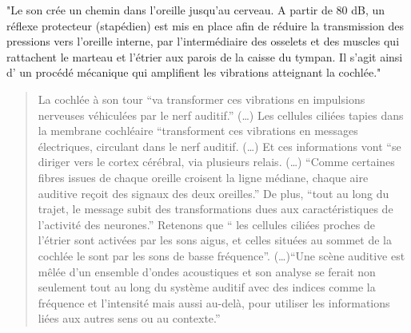 "Le  son crée un chemin dans
l'oreille \autocite[chap. 8, pp. 322--324]{marieb:biologie} jusqu'au cerveau.
A partir de 80 dB, un réflexe protecteur (stapédien) est mis en place
afin de réduire la transmission des pressions vers l\textquoteright oreille
interne, par l\textquoteright intermédiaire des osselets et des muscles
qui rattachent le marteau et l\textquoteright étrier aux parois de
la caisse du tympan. Il s'agit ainsi d' un procédé mécanique qui amplifient
les vibrations atteignant la cochlée."
\begin{quotation}
	La cochlée à son tour ``va transformer ces vibrations en impulsions
	nerveuses véhiculées par le nerf auditif.'' (\dots) Les cellules ciliées
	tapies dans la membrane cochléaire ``transforment ces vibrations
	en messages électriques, circulant dans le nerf auditif. (\dots) Et
	ces informations vont ``se diriger vers le cortex cérébral, via plusieurs
	relais. (\dots) ``Comme certaines fibres issues de chaque oreille croisent
	la ligne médiane, chaque aire auditive reçoit des signaux des deux
	oreilles.'' De plus, ``tout au long du trajet, le message subit
	des transformations dues aux caractéristiques de l'activité des neurones.''
	Retenons que `` les cellules ciliées proches de l'étrier sont activées
	par les sons aigus, et celles situées au sommet de la cochlée le sont
	par les sons de basse fréquence''. (\dots)``Une scène auditive est
	mêlée d'un ensemble d'ondes acoustiques et son analyse se ferait non
	seulement tout au long du système auditif avec des indices comme la
	fréquence et l'intensité mais aussi au-delà, pour utiliser les informations
	liées aux autres sens ou au contexte.'' \autocite[chap.1, pp.~15--16]{bigand:cerveau}
\end{quotation}


